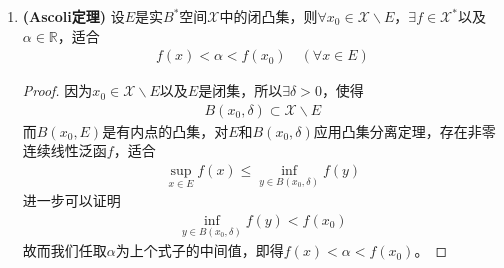 \begin{enumerate}[leftmargin=2cm, label=\arabic*]
\begin{proof}
    \begin{align*}
        f(y) \leqslant f(z) \quad (\forall y\in E_1, \forall z\in E_2)
    \end{align*}
    因此$\exists s\in\mathbb{R}$，使得
    \begin{align*}
        \sup\limits_{y\in E_1} f(y) \leqslant s\leqslant \inf\limits_{z\in E_2} f(z)
    \end{align*}
    于是$H_f^s$分离$E_1$和$E_2$，而由$H_f^r$是闭的可知$H_f^s$也是闭的。

    而条件可以减弱为$\mathring{E}_1\cap E_2=\varnothing$。由于$E_1$有内点，则$\mathring{E}_1$有内点。
    \end{proof}

    \item \textbf{(Ascoli定理)} 设$E$是实$B^*$空间$\mathscr{X}$中的闭凸集，则$\forall x_0\in\mathscr{X}\backslash E$，$\exists f\in\mathscr{X}^*$以及$\alpha\in\mathbb{R}$，适合
    \begin{align*}
        f(x) < \alpha < f(x_0) \quad (\forall x\in E)
    \end{align*}
    \begin{proof}
        因为$x_0\in\mathscr{X}\backslash E$以及$E$是闭集，所以$\exists\delta>0$，使得
        \begin{align*}
            B(x_0,\delta) \subset \mathscr{X}\backslash E
        \end{align*}
        而$B(x_0, E)$是有内点的凸集，对$E$和$B(x_0,\delta)$应用凸集分离定理，存在非零连续线性泛函$f$，适合
        \begin{align*}
            \sup\limits_{x\in E}f(x) \leqslant \inf\limits_{y\in B(x_0, \delta)} f(y)
        \end{align*}
        进一步可以证明
        \begin{align*}
            \inf\limits_{y\in B(x_0, \delta)} f(y) < f(x_0)
        \end{align*}
        故而我们任取$\alpha$为上个式子的中间值，即得$f(x)<\alpha<f(x_0)$。
    \end{proof}


\end{enumerate}
